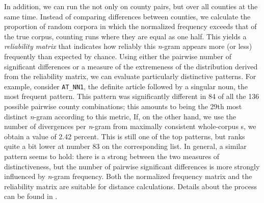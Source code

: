 \documentclass[output=paper]{LSP/langsci}
\begin{document}
In addition, we can run the  not only on county pairs, but over all counties at the same time.
Instead of comparing differences between counties, we calculate the proportion of random corpora in which the normalized frequency exceeds that of the true corpus, counting runs where they are equal as one half.
This yields a \emph{reliability matrix} that indicates how reliably this \emph{n}-gram appears more (or less) frequently than expected by chance.
Using either the pairwise number of significant differences or a measure of the extremeness of the distribution derived from the reliability matrix, we can evaluate particularly distinctive patterns.
For example, consider \texttt{AT\_NN1}, the definite article followed by a singular noun, the most frequent pattern.
This pattern was significantly different in 84 of all the 136 possible pairwise county combinations; this amounts to being the 29th most distinct \emph{n}-gram according to this metric,
If, on the other hand, we use the number of divergences per \emph{n}-gram from maximally consistent whole-corpus s, we obtain a value of 2.42 percent.
This is still one of the top patterns, but ranks quite a bit lower at number 83 on the corresponding list.
In general, a similar pattern seems to hold: there is a strong  between the two measures of distinctiveness, but the number of pairwise significant differences is more strongly influenced by \emph{n}-gram frequency.
Both the normalized frequency matrix and the reliability matrix are suitable for distance calculations.
Details about the process can be found in \citet[64-74]{wolk_integrating_2014}.
\end{document}
